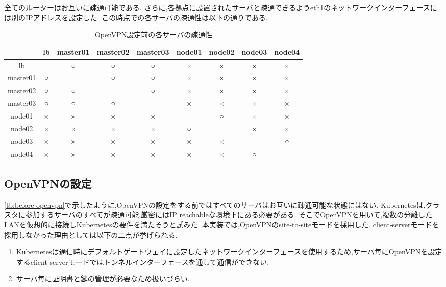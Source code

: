 全てのルーターはお互いに疎通可能である.
さらに,各拠点に設置されたサーバと疎通できるようeth1のネットワークインターフェースには別のIPアドレスを設定した.
この時点での各サーバの疎通性は以下の通りである.

\begin{table}[htb]
  \begin{center}
    \caption{OpenVPN設定前の各サーバの疎通性}
    \begin{tabular}{|c|c|c|c|c|c|c|c|c|} \hline
      & lb & master01 & master02 & master03 & node01 & node02 & node03 & node04 \\ \hline
      lb & \ & ○ & ○ & ○ & × & × & × & × \\ \hline
      master01 & ○ & \ & ○ & ○ & × & × & × & × \\ \hline
      master02 & ○ & ○ & \ & ○ & × & × & × & × \\ \hline
      master03 & ○ & ○ & ○ & \ & × & × & × & × \\ \hline
      node01 & × & × & × & × & \ & ○ & × & × \\ \hline
      node02 & × & × & × & × & ○ & \ & × & × \\ \hline
      node03 & × & × & × & × & × & × & \ & ○ \\ \hline
      node04 & × & × & × & × & × & × & ○ & \ \\ \hline
    \end{tabular}
  \end{center}
\end{table}
\label{tb:before-openvpn}

\subsection{OpenVPNの設定}

\ref{tb:before-openvpn}で示したように,OpenVPNの設定をする前ではすべてのサーバはお互いに疎通可能な状態にはない.
Kubernetesは,クラスタに参加するサーバのすべてが疎通可能,厳密にはIP reachableな環境下にある必要がある.
そこでOpenVPNを用いて,複数の分離したLANを仮想的に接続しKubernetesの要件を満たそうと試みた.
本実装では,OpenVPNのsite-to-siteモードを採用した.
client-serverモードを採用しなかった理由としては以下の二点が挙げられる.

\begin{enumerate}
  \item Kubernetesは通信時にデフォルトゲートウェイに設定したネットワークインターフェースを使用するため,サーバ毎にOpenVPNを設定するclient-serverモードではトンネルインターフェースを通して通信ができない.
  \item サーバ毎に証明書と鍵の管理が必要なため扱いづらい.
\end{enumerate}

